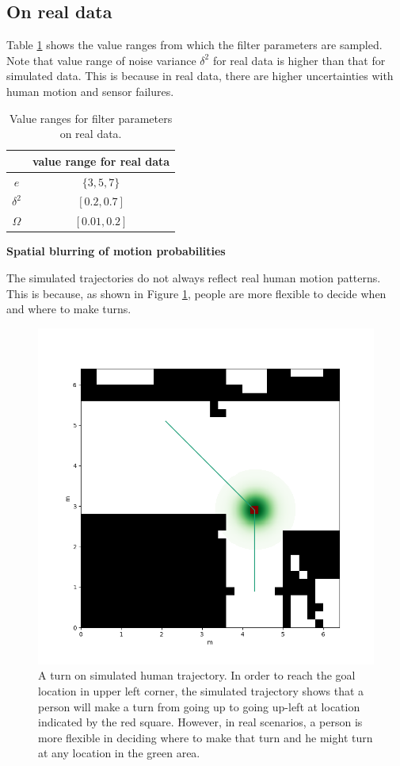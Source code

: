\subsection{On real data}

Table \ref{table:param_range_real} shows the value ranges from which the filter parameters are sampled. Note that value range of noise variance $\delta^2$ for real data is higher than that for simulated data. This is because in real data, there are higher uncertainties with human motion and sensor failures.

\begin{table}[H]
\centering
  \begin{tabular}{c|c|}
    \hline
     &  value range for real data \\ \hline
    \( e \) &  \( \{3, 5, 7\} \)\\
    \(  \delta^2\) & \( [0.2, 0.7]\) \\   
   \( \Omega \) & \( [0.01, 0.2] \)\\
   \hline
 \end{tabular}
\caption{Value ranges for filter parameters on real data.}
\label{table:param_range_real}
\end{table}

\textbf{Spatial blurring of motion probabilities}

The simulated trajectories do not always reflect real human motion patterns. This is because, as shown in Figure \ref{fig:blur_idea}, people are more flexible to decide when and where to make turns. 

\begin{figure}[ht]
  \centering
   \captionsetup{width=\linewidth}
    \includegraphics[width=.6\textwidth]{figures/blur_idea.png}
    \caption{A turn on simulated human trajectory. In order to reach the goal location in upper left corner, the simulated trajectory shows that a person will make a turn from going up to going up-left at location indicated by the red square. However, in real scenarios, a person is more flexible in deciding where to make that turn and he might turn at any location in the green area.}
    \label{fig:blur_idea}
\end{figure}


